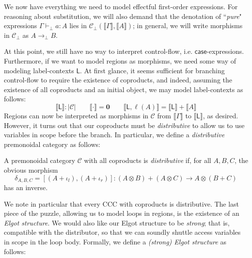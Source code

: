 \documentclass[acmsmall,screen,review]{acmart}
\newcommand{\mc}[1]{\ensuremath{\mathcal{#1}}}
\newcommand{\mb}[1]{\ensuremath{\mathbf{#1}}}
\newcommand{\ms}[1]{\ensuremath{\mathsf{#1}}}
\newcommand{\lhyp}[2]{#1(#2)}
\newcommand{\hasty}[4]{#1 \vdash_{#2} #3: {#4}}
\newcommand{\dnt}[1]{\llbracket{#1}\rrbracket}
\begin{document}
We now have everything we need to model effectful first-order expressions. For reasoning about
substitution, we will also demand that the denotation of ``\emph{pure}" expressions
$\hasty{\Gamma}{\bot}{a}{A}$ lies in $\mc{C}_\bot(\dnt{\Gamma}, \dnt{A})$; in general, we will write
morphisms in $\mc{C}_\bot$ as $A \to_\bot B$.

At this point, we still have no way to interpret control-flow, i.e. $\ms{case}$-expressions.
Furthermore, if we want to model regions as morphisms, we need some way of modeling label-contexts
$\ms{L}$. At first glance, it seems sufficient for branching control-flow to require the existence
of coproducts, and indeed, assuming the existence of all coproducts and an initial object, we may
model label-contexts as follows:
$$
\boxed{\dnt{\ms{L}} : |\mc{C}|} \qquad 
  \dnt{\cdot} = \mb{0} \qquad \dnt{\ms{L}, \lhyp{\ell}{A}} = \dnt{\ms{L}} + \dnt{A}
$$
Regions can now be interpreted as morphisms in $\mc{C}$ from $\dnt{\Gamma}$ to $\dnt{\ms{L}}$, as
desired. However, it turns out that our coproducts must be \emph{distributive} to allow us to use
variables in scope before the branch. In particular, we define a \emph{distributive} premonoidal
category as follows:
\begin{definition}
  A premonoidal category $\mc{C}$ with all coproducts is \emph{distributive} if, for all $A, B, C$,
  the obvious morphism
  $$
  \delta_{A, B, C} 
    = [(A + \iota_l), (A + \iota_r)] : (A \otimes B) + (A \otimes C) \to A \otimes (B + C)
  $$
  has an inverse.
\end{definition}
We note in particular that every CCC with coproducts is distributive. The last piece of the puzzle,
allowing us to model loops in regions, is the existence of an \emph{Elgot structure}. We would also
like our Elgot structure to be \emph{strong}; that is, compatible with the distributor, so that we
can soundly shuttle access variables in scope in the loop body. Formally, we define a \emph{(strong)
Elgot structure} as follows:
\end{document}
